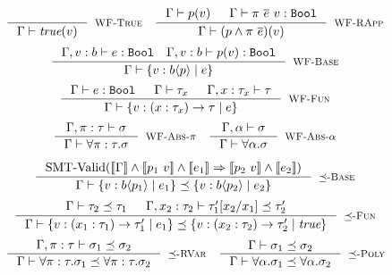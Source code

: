 \begin{figure}[p]
\centering
\captionsetup{justification=centering}

$$
\inference
  {}
  {\isWellFormed{\Gamma}{\true(\vref)}}
  [\wtTrue]
\quad
\inference
    {\isWellFormed{\Gamma}{\areft(\vref)} && 
     \hastype{\Gamma}{\rvapp{\rvar}{e} \ \vref}{\tbbool}
    }
    {\isWellFormed{\Gamma}{(\areft \wedge \rvapp{\rvar}{e})(\vref)}}
    [\wtRVApp]
$$
%
$$\inference
    {\hastype{\Gamma, \vref:b}{\reft}{\tbbool} \quad 
     \hastype{\Gamma, \vref:b}{\areft(\vref)}{\tbbool}
    }
    {\isWellFormed{\Gamma}{\tpref{b}{\areft}{\reft}}}
    [\wtBase]
$$
%
$$
\inference
    {
	\hastype{\Gamma}{\reft}{\tbbool} &&
    \isWellFormed{\Gamma}{\tau_x} &&
	\isWellFormed{\Gamma, x:\tau_x}{\tau}
    }
    {\isWellFormed{\Gamma}{\trfun{x}{\tau_x}{\tau}{\reft}}}
    [\wtFun]
$$
%
$$
\inference
  {\isWellFormed{\Gamma, \rvar:\tau}{\sigma}}
  {\isWellFormed{\Gamma}{\tpabs{\rvar}{\tau}{\sigma}}}
  [\wtPred]
\quad
\inference
    {\isWellFormed{\Gamma, \alpha}{\sigma}}
    {\isWellFormed{\Gamma}{\ttabs{\alpha}{\sigma}}}
    [\wtPoly]
$$

\medskip {}

$$
\inference
   {\text{SMT-Valid}(\inter{\Gamma} \land \inter{\areft_1\ \vref} \land \inter{\reft_1} 
                 \Rightarrow \inter{\areft_2\ \vref} \land \inter{\reft_2})}
   {\isSubType{\Gamma}{\tpref{b}{\areft_1}{\reft_1}}{\tpref{b}{\areft_2}{\reft_2}}}
   [\tsubBase]
$$
%
$$
\inference
   {%
	\isSubType{\Gamma}{\tau_2}{\tau_1} &
	\isSubType{\Gamma, x_2:{\tau_2}}{\SUBST{\tau_1'}{x_1}{x_2}}{\tau_2'}	
   }
   {\isSubType{\Gamma}
	  {\trfun{x_1}{\tau_1}{\tau_1'}{\reft_1}}
	  {\trfun{x_2}{\tau_2}{\tau_2'}{\true}}
}[\tsubFun]
$$
%
$$
\inference
   {\isSubType{\Gamma, \rvar:\tau}{\sigma_1}{\sigma_2}}
   {\isSubType{\Gamma}{\tpabs{\rvar}{\tau}{\sigma_1}}{\tpabs{\rvar}{\tau}{\sigma_2}}}
   [\tsubPred]
\quad
\inference
   {\isSubType{\Gamma}{\sigma_1}{\sigma_2}}
   {\isSubType{\Gamma}{\ttabs{\alpha}{\sigma_1}}{\ttabs{\alpha}{\sigma_2}}}
   [\tsubPoly]
$$

\medskip {}


\end{figure}

